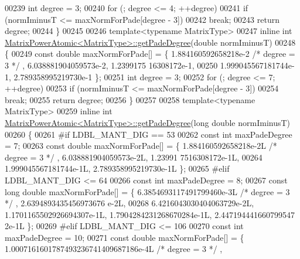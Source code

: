 \begin{DoxyCode}
00239   \textcolor{keywordtype}{int} degree = 3;
00240   \textcolor{keywordflow}{for} (; degree <= 4; ++degree)
00241     \textcolor{keywordflow}{if} (normIminusT <= maxNormForPade[degree - 3])
00242       \textcolor{keywordflow}{break};
00243   \textcolor{keywordflow}{return} degree;
00244 \}
00245 
00246 \textcolor{keyword}{template}<\textcolor{keyword}{typename} MatrixType>
00247 \textcolor{keyword}{inline} \textcolor{keywordtype}{int} \hyperlink{class_eigen_1_1_matrix_power_atomic}{MatrixPowerAtomic<MatrixType>::getPadeDegree}(\textcolor{keywordtype}{double} 
      normIminusT)
00248 \{
00249   \textcolor{keyword}{const} \textcolor{keywordtype}{double} maxNormForPade[] = \{ 1.884160592658218e-2 \textcolor{comment}{/* degree = 3 */} , 6.038881904059573e-2, 1.2399175
      16308172e-1,
00250       1.999045567181744e-1, 2.789358995219730e-1 \};
00251   \textcolor{keywordtype}{int} degree = 3;
00252   \textcolor{keywordflow}{for} (; degree <= 7; ++degree)
00253     \textcolor{keywordflow}{if} (normIminusT <= maxNormForPade[degree - 3])
00254       \textcolor{keywordflow}{break};
00255   \textcolor{keywordflow}{return} degree;
00256 \}
00257 
00258 \textcolor{keyword}{template}<\textcolor{keyword}{typename} MatrixType>
00259 \textcolor{keyword}{inline} \textcolor{keywordtype}{int} \hyperlink{class_eigen_1_1_matrix_power_atomic}{MatrixPowerAtomic<MatrixType>::getPadeDegree}(\textcolor{keywordtype}{long} \textcolor{keywordtype}{
      double} normIminusT)
00260 \{
00261 \textcolor{preprocessor}{#if   LDBL\_MANT\_DIG == 53}
00262   \textcolor{keyword}{const} \textcolor{keywordtype}{int} maxPadeDegree = 7;
00263   \textcolor{keyword}{const} \textcolor{keywordtype}{double} maxNormForPade[] = \{ 1.884160592658218e-2L \textcolor{comment}{/* degree = 3 */} , 6.038881904059573e-2L, 1.23991
      7516308172e-1L,
00264       1.999045567181744e-1L, 2.789358995219730e-1L \};
00265 \textcolor{preprocessor}{#elif LDBL\_MANT\_DIG <= 64}
00266   \textcolor{keyword}{const} \textcolor{keywordtype}{int} maxPadeDegree = 8;
00267   \textcolor{keyword}{const} \textcolor{keywordtype}{long} \textcolor{keywordtype}{double} maxNormForPade[] = \{ 6.3854693117491799460e-3L \textcolor{comment}{/* degree = 3 */} , 2.6394893435456973676
      e-2L,
00268       6.4216043030404063729e-2L, 1.1701165502926694307e-1L, 1.7904284231268670284e-1L, 2.447194441660799547
      2e-1L \};
00269 \textcolor{preprocessor}{#elif LDBL\_MANT\_DIG <= 106}
00270   \textcolor{keyword}{const} \textcolor{keywordtype}{int} maxPadeDegree = 10;
00271   \textcolor{keyword}{const} \textcolor{keywordtype}{double} maxNormForPade[] = \{ 1.0007161601787493236741409687186e-4L \textcolor{comment}{/* degree = 3 */} ,

\end{DoxyCode}
